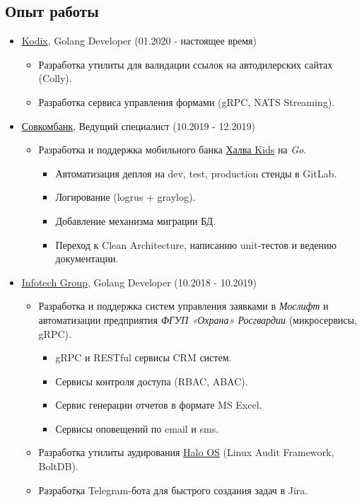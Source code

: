 \documentclass[11pt]{article}
\begin{document}
\subsection{Опыт работы}
\label{sec:org06b446d}
\begin{itemize}
\item \href{https://agency.kodix.ru/}{Kodix}, Golang Developer (01.2020 - настоящее время)
\begin{itemize}
\item Разработка утилиты для валидации ссылок на автодилерских сайтах (Colly).
\item Разработка сервиса управления формами (gRPC, NATS Streaming).
\end{itemize}
\item \href{https://sovcombank.ru}{Совкомбанк}, Ведущий специалист (10.2019 - 12.2019)
\begin{itemize}
\item Разработка и поддержка мобильного банка \href{https://kids.halvacard.ru}{Халва Kids} на \emph{Go}.
\begin{itemize}
\item Автоматизация деплоя на dev, test, production стенды в GitLab.
\item Логирование (logrus + graylog).
\item Добавление механизма миграции БД.
\item Переход к Clean Architecture, написанию unit-тестов и ведению
документации.
\end{itemize}
\end{itemize}
\item \href{https://www.infotech.group/}{Infotech Group}, Golang Developer (10.2018 - 10.2019)
\begin{itemize}
\item Разработка и поддержка систем управления заявками в \emph{Мослифт} и
автоматизации предприятия \emph{ФГУП «Охрана» Росгвардии} (микросервисы, gRPC).
\begin{itemize}
\item gRPC и RESTful сервисы CRM систем.
\item Сервисы контроля доступа (RBAC, ABAC).
\item Сервис генерации отчетов в формате MS Excel.
\item Сервисы оповещений по email и sms.
\end{itemize}
\item Разработка утилиты аудирования \href{https://haloos.ru}{Halo OS} (Linux Audit Framework, BoltDB).
\item Разработка Telegram-бота для быстрого создания задач в Jira.

\end{itemize}
\end{itemize}
\end{document}
